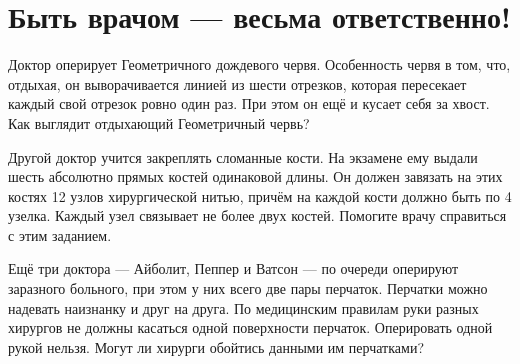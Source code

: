\section{Быть врачом — весьма ответственно!}
\begin{itemize}

\itA Доктор оперирует Геометричного дождевого червя. Особенность червя в том, что, отдыхая, он выворачивается линией из шести отрезков, которая пересекает каждый свой отрезок ровно один раз. При этом он ещё и кусает себя за хвост. Как выглядит отдыхающий Геометричный червь?

\itB Другой доктор учится закреплять сломанные кости. На экзамене ему выдали шесть абсолютно прямых костей одинаковой длины. Он должен завязать на этих костях 12 узлов хирургической нитью, причём на каждой кости должно быть по 4 узелка. Каждый узел связывает не более двух костей. Помогите врачу справиться с этим заданием.

\itC Ещё три доктора — Айболит, Пеппер и Ватсон — по очереди оперируют заразного больного, при этом у них всего две пары перчаток. Перчатки можно надевать наизнанку и друг на друга. По медицинским правилам руки разных хирургов не должны касаться одной поверхности перчаток. Оперировать одной рукой нельзя. Могут ли хирурги обойтись данными им перчатками?
\end{itemize}